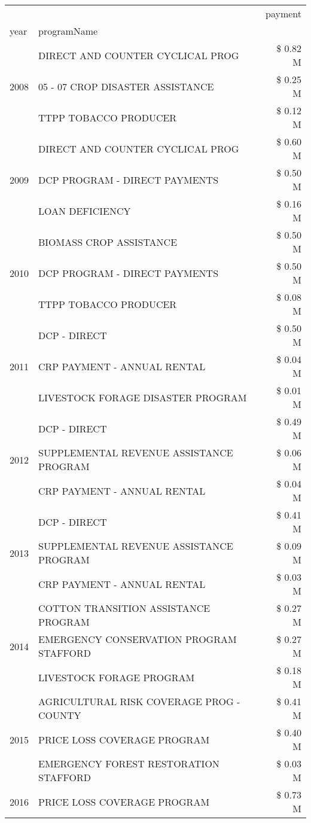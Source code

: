 \begin{tabular}{llr}
\toprule
 &  & payment \\
year & programName &  \\
\midrule
\multirow[t]{3}{*}{2008} & DIRECT AND COUNTER CYCLICAL PROG & \$ 0.82 M \\
 & 05 - 07 CROP DISASTER ASSISTANCE & \$ 0.25 M \\
 & TTPP TOBACCO PRODUCER & \$ 0.12 M \\
\cline{1-3}
\multirow[t]{3}{*}{2009} & DIRECT AND COUNTER CYCLICAL PROG & \$ 0.60 M \\
 & DCP PROGRAM - DIRECT PAYMENTS & \$ 0.50 M \\
 & LOAN DEFICIENCY & \$ 0.16 M \\
\cline{1-3}
\multirow[t]{3}{*}{2010} & BIOMASS CROP ASSISTANCE & \$ 0.50 M \\
 & DCP PROGRAM - DIRECT PAYMENTS & \$ 0.50 M \\
 & TTPP TOBACCO PRODUCER & \$ 0.08 M \\
\cline{1-3}
\multirow[t]{3}{*}{2011} & DCP - DIRECT & \$ 0.50 M \\
 & CRP PAYMENT - ANNUAL RENTAL & \$ 0.04 M \\
 & LIVESTOCK FORAGE DISASTER PROGRAM & \$ 0.01 M \\
\cline{1-3}
\multirow[t]{3}{*}{2012} & DCP - DIRECT & \$ 0.49 M \\
 & SUPPLEMENTAL REVENUE ASSISTANCE PROGRAM & \$ 0.06 M \\
 & CRP PAYMENT - ANNUAL RENTAL & \$ 0.04 M \\
\cline{1-3}
\multirow[t]{3}{*}{2013} & DCP - DIRECT & \$ 0.41 M \\
 & SUPPLEMENTAL REVENUE ASSISTANCE PROGRAM & \$ 0.09 M \\
 & CRP PAYMENT - ANNUAL RENTAL & \$ 0.03 M \\
\cline{1-3}
\multirow[t]{3}{*}{2014} & COTTON TRANSITION ASSISTANCE PROGRAM & \$ 0.27 M \\
 & EMERGENCY CONSERVATION PROGRAM STAFFORD & \$ 0.27 M \\
 & LIVESTOCK FORAGE PROGRAM & \$ 0.18 M \\
\cline{1-3}
\multirow[t]{3}{*}{2015} & AGRICULTURAL RISK COVERAGE PROG - COUNTY & \$ 0.41 M \\
 & PRICE LOSS COVERAGE PROGRAM & \$ 0.40 M \\
 & EMERGENCY FOREST RESTORATION STAFFORD & \$ 0.03 M \\
\cline{1-3}
\multirow[t]{3}{*}{2016} & PRICE LOSS COVERAGE PROGRAM & \$ 0.73 M \\

\end{tabular}
